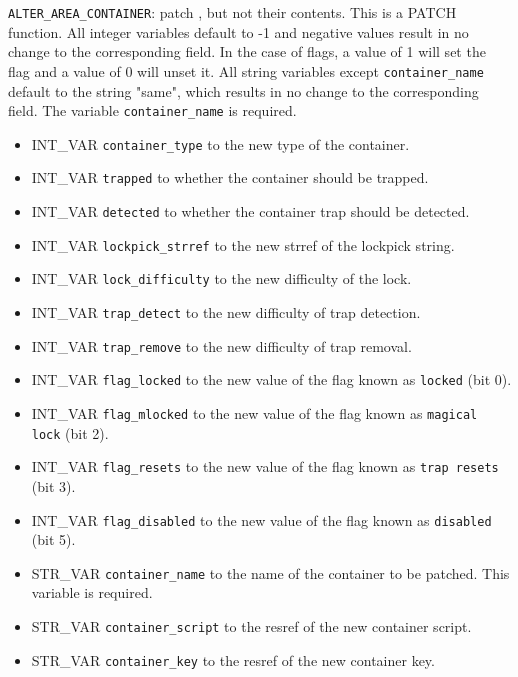 \documentclass{article}
\def\t#1{{\tt #1}}
\begin{document}
\verb+ALTER_AREA_CONTAINER+: patch , but not their contents. This is a PATCH function. All integer variables default to -1 and negative values result in no change to the corresponding field. In the case of flags, a value of 1 will set the flag and a value of 0 will unset it. All string variables except \verb+container_name+ default to the string "same", which results in no change to the corresponding field. The variable \verb+container_name+ is required.
\begin{itemize}
\item INT_VAR \verb+container_type+ to the new type of the container.
\item INT_VAR \verb+trapped+ to whether the container should be trapped.
\item INT_VAR \verb+detected+ to whether the container trap should be detected.
\item INT_VAR \verb+lockpick_strref+ to the new strref of the lockpick string.
\item INT_VAR \verb+lock_difficulty+ to the new difficulty of the lock.
\item INT_VAR \verb+trap_detect+ to the new difficulty of trap detection.
\item INT_VAR \verb+trap_remove+ to the new difficulty of trap removal.
\item INT_VAR \verb+flag_locked+ to the new value of the flag known as \t{locked} (bit 0).
\item INT_VAR \verb+flag_mlocked+ to the new value of the flag known as \t{magical lock} (bit 2).
\item INT_VAR \verb+flag_resets+ to the new value of the flag known as \t{trap resets} (bit 3).
\item INT_VAR \verb+flag_disabled+ to the new value of the flag known as \t{disabled} (bit 5).
\item STR_VAR \verb+container_name+ to the name of the container to be patched. This variable is required.
\item STR_VAR \verb+container_script+ to the resref of the new container script.
\item STR_VAR \verb+container_key+ to the resref of the new container key.
\end{itemize}
\\
\end{document}
